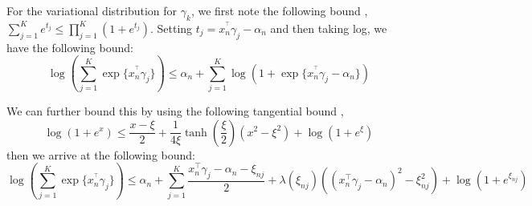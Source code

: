 \documentclass[twoside,11pt]{article}
\begin{document}

For the variational distribution for $\gamma_k$, we first note the following bound \parencite{bouchard:07}, $\sum_{j = 1}^{K} e^{t_j} \leq \prod_{j = 1}^K (1 + e^{t_j})$. Setting $t_j = x_n^{^\intercal} \gamma_j - \alpha_{n}$ and then taking log, we have the following bound:
\begin{equation} \label{eq:log-sum-exp}
	\log \left( \sum_{j = 1}^K \exp\{ x_n^{^\intercal} \gamma_j \}\right) \leq \alpha_n + \sum_{j=1}^K \log \left( 1 + \exp \{ x_n^{^\intercal} \gamma_j - \alpha_n \}\right)
\end{equation}


We can further bound this by using the following tangential bound \parencite{jj:2001}, $$\log(1 + e^x) \leq \frac{x - \xi}{2} + \frac{1}{4\xi} \tanh \left( \frac{\xi}{2} \right) (x^2 - \xi^2) + \log\left(1 + e^{\xi}\right)$$ then we arrive at the following bound: 
\begin{equation} \label{eq:jj_bound}
	\log \left( \sum_{j = 1}^K \exp\{ x_n^{^\intercal} \gamma_j \}\right) \leq 
\alpha_n + \sum_{j = 1}^K \frac{x_n^{\intercal} \gamma_j - \alpha_n - \xi_{nj}}{2} + \lambda(\xi_{nj}) \left( (x_n^{\intercal} \gamma_j - \alpha_n)^2 - \xi_{nj}^2\right) + \log \left( 1 + e^{\xi_{nj}}\right)
\end{equation}
\end{document}
